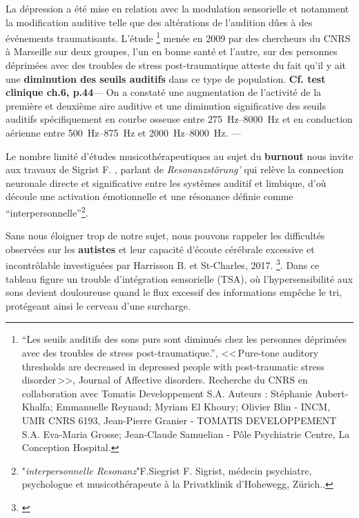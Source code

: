 La dépression a été mise en relation avec la
modulation sensorielle et notamment la modification auditive telle que
des altérations de l'audition dûes à des événements
traumatisants. 
L'étude  \footnote{``Les seuils auditifs des sons purs 
	sont diminués chez les personnes déprimées avec des
	troubles de stress post-traumatique.'', <<\,Pure-tone auditory 
	thresholds are decreased in depressed people with post-traumatic stress 
disorder\,>>, Journal of Affective disorders. Recherche du CNRS en collaboration
	avec Tomatis Developpement S.A. Auteurs : Stéphanie 
	Aubert-Khalfa; Emmanuelle Reynaud; Myriam El Khoury;
	Olivier Blin - INCM, UMR CNRS 6193, Jean-Pierre Granier -
	TOMATIS DEVELOPPEMENT S.A. Eva-Maria Grosse; Jean-Claude 
	Samuelian - Pôle Psychiatrie Centre, La Conception Hospital.}
       menée en 2009 par des chercheurs du CNRS à Marseille sur deux
groupes, l'un en bonne santé et l'autre,
sur des personnes déprimées avec des troubles de stress
post-traumatique  atteste du 
fait qu'il y ait une\textbf{ diminution des seuils auditifs} dans ce type de
population.\textbf{ Cf. test clinique ch.6, p.44}--- On a constaté une augmentation de l'activité de la
première et deuxième aire auditive et une diminution significative des
seuils auditifs spécifiquement en courbe osseuse entre
\SIrange{275}{8000}{\Hz} et en conduction aérienne entre
\SIrange{500}{875}{\Hz} et  \SIrange{2000}{8000}{\Hz}. ---







Le nombre limité d'études musicothérapeutiques au sujet du \textbf{burnout}
nous invite aux travaux de Sigrist F. ,  parlant de
\textit{Resonanzstörung'} qui relève la connection neuronale directe et significative entre les systèmes auditif et
         limbique, d'où découle une activation émotionnelle et une
         résonance définie comme ``interpersonnelle''\footnote{"\textit{interpersonnelle Resonanz}"F.Siegrist F. Sigrist, médecin
psychiatre, psychologue et musicothérapeute à la Privatklinik
d'Hohewegg, Zürich.\autocite[pp.55--90] {sigrist_burnout_2016}.}.



Sans nous éloigner trop de notre sujet, nous pouvons rappeler
les difficultés observées sur les
\textbf{autistes} et leur capacité d'écoute cérébrale excessive et
incontrôlable investiguées par Harrisson B. et St-Charles, 2017. \footnote{\autocite[Cet ouvrage propose une description unique du TSA
   (trouble du spectre de l'autisme
   pp. 22--23)]{harrisson.st-charles:lautisme} }. Dans ce tableau
 figure un trouble d'intégration sensorielle (TSA), où
 l'hypersensibilité aux sons devient douloureuse quand le flux excessif
 des
 informations empêche le tri,  protégeant ainsi le cerveau d'une surcharge.


